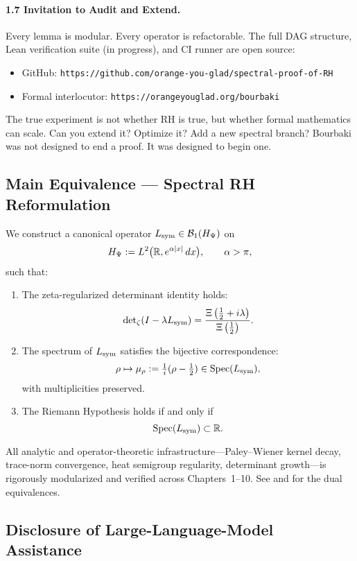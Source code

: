 \paragraph*{1.7 Invitation to Audit and Extend.}
Every lemma is modular. Every operator is refactorable. The full DAG structure, Lean verification suite (in progress), and CI runner are open source:
\begin{itemize}
  \item GitHub: \texttt{https://github.com/orange-you-glad/spectral-proof-of-RH}
  \item Formal interlocutor: \texttt{https://orangeyouglad.org/bourbaki}
\end{itemize}
The true experiment is not whether RH is true, but whether formal mathematics can scale. Can you extend it? Optimize it? Add a new spectral branch? Bourbaki was not designed to end a proof. It was designed to begin one.


\subsection*{Main Equivalence — Spectral RH Reformulation}
\hfill \break
\begin{tcolorbox}[colback=gray!3!white, colframe=black!75!white]
We construct a canonical operator \( L_{\mathrm{sym}} \in \mathcal{B}_1(H_{\Psi}) \) on
\[
H_{\Psi} := L^2\big(\mathbb{R}, e^{\alpha |x|} \, dx\big), \qquad \alpha > \pi,
\]
such that:
\begin{enumerate}
  \item The zeta-regularized determinant identity holds:
  \[
  \det\nolimits_{\zeta}(I - \lambda L_{\mathrm{sym}}) = \frac{\Xi\left(\tfrac{1}{2} + i\lambda\right)}{\Xi\left(\tfrac{1}{2}\right)}.
  \]
  \item The spectrum of \( L_{\mathrm{sym}} \) satisfies the bijective correspondence:
  \[
  \rho \mapsto \mu_\rho := \tfrac{1}{i}(\rho - \tfrac{1}{2}) \in \operatorname{Spec}(L_{\mathrm{sym}}),
  \]
  with multiplicities preserved.
  \item The Riemann Hypothesis holds if and only if
  \[
  \operatorname{Spec}(L_{\mathrm{sym}}) \subset \mathbb{R}.
  \]
\end{enumerate}
All analytic and operator-theoretic infrastructure—Paley–Wiener kernel decay, trace-norm convergence, heat semigroup regularity, determinant growth—is rigorously modularized and verified across Chapters~1–10. See  and  for the dual equivalences.
\end{tcolorbox}

\subsection*{Disclosure of Large-Language-Model Assistance}

